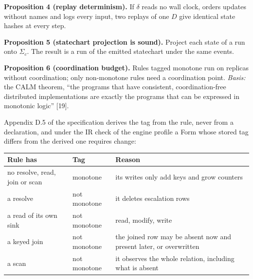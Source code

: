 \documentclass[10pt,letterpaper]{article}
\newcounter{none}
\begin{document}
\textbf{Proposition 4 (replay determinism).} If \(\delta\) reads no wall
clock, orders updates without names and logs every input, two replays of
one \(D\) give identical state hashes at every step.

\textbf{Proposition 5 (statechart projection is sound).} Project each
state of a run onto \(\Sigma_c\). The result is a run of the emitted
statechart under the same events.

\textbf{Proposition 6 (coordination budget).} Rules tagged monotone run
on replicas without coordination; only non-monotone rules need a
coordination point. \emph{Basis:} the CALM theorem, ``the programs that
have consistent, coordination-free distributed implementations are
exactly the programs that can be expressed in monotonic logic''
{[}19{]}.

Appendix D.5 of the specification derives the tag from the rule, never
from a declaration, and under the IR check of the engine profile a Form
whose stored tag differs from the derived one requires change:

{\def\LTcaptype{none} %
{\footnotesize\setlength{\tabcolsep}{3.8pt}\renewcommand{\arraystretch}{1.15}
\begin{longtable}[]{@{}
  >{\raggedright\arraybackslash}p{}
  >{\raggedright\arraybackslash}p{}
  >{\raggedright\arraybackslash}p{}@{}}
\toprule\noalign{}
\begin{minipage}[b]{\linewidth}\raggedright
\textbf{Rule has}
\end{minipage} & \begin{minipage}[b]{\linewidth}\raggedright
\textbf{Tag}
\end{minipage} & \begin{minipage}[b]{\linewidth}\raggedright
\textbf{Reason}
\end{minipage} \\
\midrule\noalign{}
\endhead
\bottomrule\noalign{}
\endlastfoot
no resolve, read, join or scan & monotone & its writes only add keys and
grow counters \\
a resolve & not monotone & it deletes escalation rows \\
a read of its own sink & not monotone & read, modify, write \\
a keyed join & not monotone & the joined row may be absent now and
present later, or overwritten \\
a scan & not monotone & it observes the whole relation, including what
is absent \\
\end{longtable}
}
}
\end{document}
